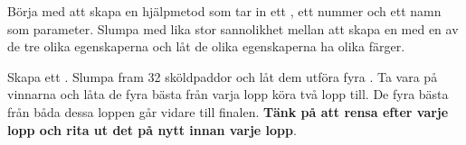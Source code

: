 \Task {}

\Subtask Börja med att skapa en hjälpmetod  som tar in ett , ett nummer och ett namn som parameter. Slumpa med lika stor sannolikhet mellan att skapa en  med en av de tre olika egenskaperna och låt de olika egenskaperna ha olika färger.

\Subtask Skapa ett . Slumpa fram 32 sköldpaddor och låt dem utföra fyra . Ta vara på vinnarna och låta de fyra bästa från varja lopp köra två lopp till. De fyra bästa från båda dessa loppen går vidare till finalen. \textbf{Tänk på att rensa  efter varje lopp och rita ut det på nytt innan varje lopp}.
